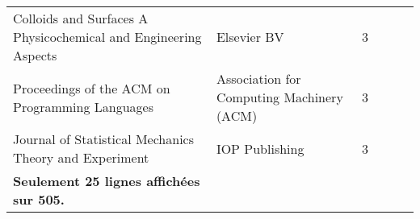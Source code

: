 \begin{longtable}{p{.27\linewidth}P{.18\linewidth}P{.07\linewidth}P{.12\linewidth}P{.12\linewidth}P{.07\linewidth}}
Colloids and Surfaces A Physicochemical and Engineering Aspects & Elsevier BV & 3 &    &    &  \\
Proceedings of the ACM on Programming Languages & Association for Computing Machinery (ACM) & 3 &    &    &  \\
Journal of Statistical Mechanics Theory and Experiment & IOP Publishing & 3 &    &    &  \\
\textbf{Seulement 25 lignes affichées sur 505.} \\
\bottomrule
\end{longtable}
